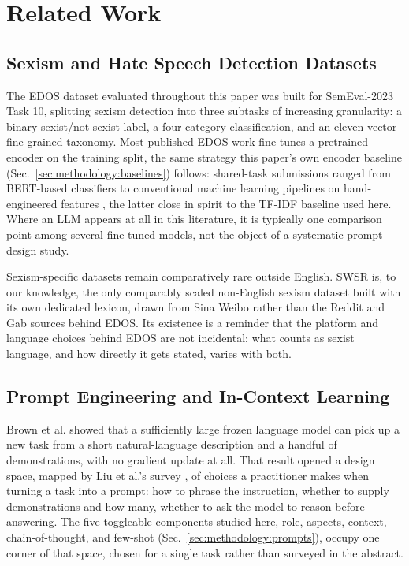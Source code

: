 \section{Related Work}
\label{sec:related}

\subsection{Sexism and Hate Speech Detection Datasets}
\label{sec:related:datasets}

The EDOS dataset \cite{kirk2023semeval} evaluated throughout this paper
was built for SemEval-2023 Task 10, splitting sexism detection into
three subtasks of increasing granularity: a binary sexist/not-sexist
label, a four-category classification, and an eleven-vector
fine-grained taxonomy. Most published EDOS work fine-tunes a pretrained
encoder on the training split, the same strategy this paper's own
encoder baseline (Sec.~\ref{sec:methodology:baselines}) follows:
shared-task submissions ranged from BERT-based classifiers
\cite{rifat2023acsmkrhr} to conventional machine learning pipelines on
hand-engineered features \cite{panwar2023edos}, the latter close in
spirit to the TF-IDF baseline used here. Where an LLM appears at all in
this literature, it is typically one comparison point among several
fine-tuned models, not the object of a systematic prompt-design study.

Sexism-specific datasets remain comparatively rare outside English. SWSR
\cite{jiang2021swsr} is, to our knowledge, the only comparably scaled
non-English sexism dataset built with its own dedicated lexicon, drawn from
Sina Weibo rather than the Reddit and Gab sources behind EDOS. Its
existence is a reminder that the platform and language choices behind EDOS
are not incidental: what counts as sexist language, and how directly it
gets stated, varies with both.

\subsection{Prompt Engineering and In-Context Learning}
\label{sec:related:prompting}

Brown et al. \cite{brown2020gpt3} showed that a sufficiently large frozen
language model can pick up a new task from a short natural-language
description and a handful of demonstrations, with no gradient update at
all. That result opened a design space, mapped by Liu et al.'s survey
\cite{liu2021pretrain}, of choices a practitioner makes when turning a
task into a prompt: how to phrase the instruction, whether to supply
demonstrations and how many, whether to ask the model to reason before
answering. The five toggleable components studied here, role, aspects,
context, chain-of-thought, and few-shot
(Sec.~\ref{sec:methodology:prompts}), occupy one corner of that space,
chosen for a single task rather than surveyed in the abstract.

